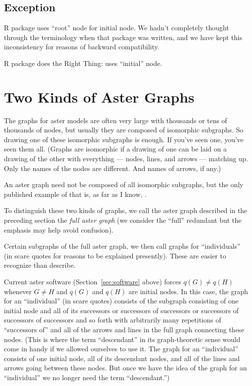 \subsection{Exception}
\label{sec:exception-root}

R package  uses ``root'' node for initial node.
We hadn't completely thought through the terminology when that package
was written, and we have kept this inconsistency for reasons of backward
compatibility.

R package  does the Right Thing: uses ``initial'' node.

\section{Two Kinds of Aster Graphs}
\label{sec:scare-quotes}

The graphs for aster models are often very large with thousands or tens of
thousands of nodes, but usually they are composed of isomorphic subgraphs.
So drawing one of these isomorphic subgraphs is enough.
If you've seen one, you've seen them all.
(Graphs are isomorphic if a drawing of one can be laid on a drawing of the
other with everything --- nodes, lines, and arrows --- matching up.
Only the names of the nodes are different.  And names of arrows, if any.)

An aster graph need not be composed of all isomorphic subgraphs,
but the only published example of that is, as far as I know,
\citet{aster-hornworm}.

To distinguish these two kinds of graphs, we call the aster graph described
in the preceding section the \emph{full aster graph} (we consider the ``full''
redundant but the emphasis may help avoid confusion).

Certain subgraphs of the full aster graph, we then call graphs
for ``individuals'' (in scare quotes for reasons to be explained presently).
These are easier to recognize than describe.

Current aster software (Section~\ref{sec:software} above) forces
$q(G) \neq q(H)$ whenever $G \neq H$ and $q(G)$ and $q(H)$ are initial nodes.
In this case, the graph for an ``individual'' (in scare quotes)
consists of the subgraph consisting of one initial node and all of its
successors or successors of successors or successors of successors
of successors and so forth with arbitrarily many repetitions
of ``successors of'' and all of the arrows and lines in the full graph
connecting these nodes.
(This is where the term ``descendant'' in its graph-theoretic sense would
come in handy if we allowed ourselves to use it.  The graph for an
``individual'' consists of one initial node, all of its descendant nodes,
and all of the lines and arrows going between these nodes.  But once we
have the idea of the graph for an ``individual'' we no longer need the
term ``descendant.'')

